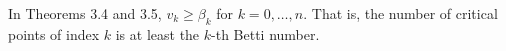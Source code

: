 In Theorems 3.4 and 3.5, $v_k \geqslant \beta_k$ for $k = 0, \ldots, n$. That is, the number of critical points of index $k$ is at least the $k$-th Betti number.
